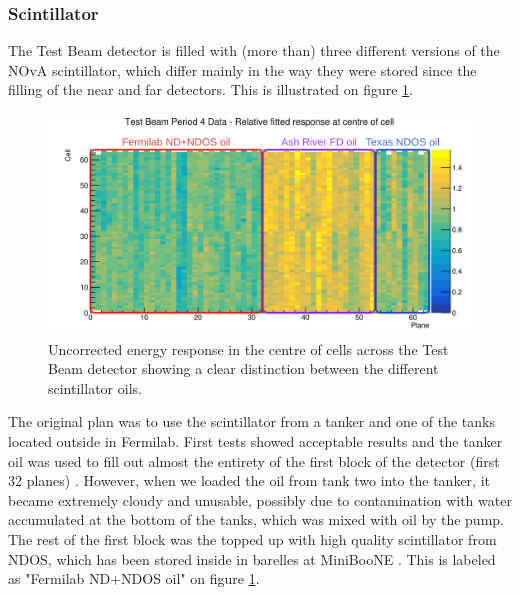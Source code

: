 \documentclass[12pt,a4paper]{article}
\begin{document}

\subsubsection*{Scintillator}
The Test Beam detector is filled with (more than) three different versions of the NOvA scintillator, which differ mainly in the way they were stored since the filling of the near and far detectors. This is illustrated on figure \ref{figScintillators}.

\begin{figure}[!ht]
\centering
\includegraphics[width=\textwidth]{Plots/TestBeamScintillatorOils.png}
\caption{Uncorrected energy response in the centre of cells across the Test Beam detector showing a clear distinction between the different scintillator oils.}
\label{figScintillators}
\end{figure}

The original plan \cite{NOVA-doc-34196} was to use the scintillator from a tanker and one of the tanks located outside in Fermilab. First tests showed acceptable results and the tanker oil was used to fill out almost the entirety of the first block of the detector (first 32 planes) \cite{NOVA-doc-38349}. However, when we loaded the oil from tank two into the tanker, it became extremely cloudy and unusable, possibly due to contamination with water accumulated at the bottom of the tanks, which was mixed with oil by the pump. The rest of the first block was the topped up with high quality scintillator from NDOS, which has been stored inside in barelles at MiniBooNE \cite{NOVA-doc-33012}. This is labeled as "Fermilab ND+NDOS oil" on figure \ref{figScintillators}.

\end{document}
